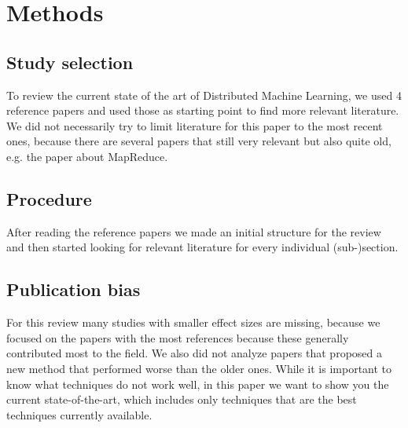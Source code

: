 \section{Methods}

\subsection{Study selection}
To review the current state of the art of Distributed Machine Learning, we used 4 reference papers\cite{Bal12}\cite{Die12}\cite{Xing16}\cite{Zhang16} and used those as starting point to find more relevant literature. We did not necessarily try to limit literature for this paper to the most recent ones, because there are several papers that still very relevant but also quite old, e.g. the paper about MapReduce\cite{Dean04}.
\subsection{Procedure}
After reading the reference papers \cite{Bal12}\cite{Die12}\cite{Xing16}\cite{Zhang16} we made an initial structure for the review and then started looking for relevant literature for every individual (sub-)section.
\subsection{Publication bias}
For this review many studies with smaller effect sizes are missing, because we focused on the papers with the most references because these generally contributed most to the field. We also did not analyze papers that proposed a new method that performed worse than the older ones. While it is important to know what techniques do not work well, in this paper we want to show you the current state-of-the-art, which includes only techniques that are the best techniques currently available.